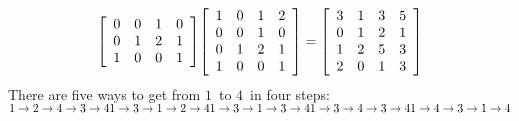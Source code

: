 \documentclass{letter}
\newcommand{\?}{\stackrel{?}{=}}
\newenvironment{Mat}[1]{%
  \left[\begin{array}{*{#1}{r}}
}{%
  \end{array}\right]
}
\begin{document}
\begin{enumerate}
\begin{enumerate}[label=(\alph*)]
{\begin{align*}
\begin{Mat}{4}
                             0 & 0 & 1 & 0 \\
                             0 & 1 & 2 & 1 \\
                             1 & 0 & 0 & 1 
                             \end{Mat}
              \begin{Mat}{4} 1 & 0 & 1 & 2 \\
                             0 & 0 & 1 & 0 \\
                             0 & 1 & 2 & 1 \\
                             1 & 0 & 0 & 1 
                             \end{Mat}
             =\begin{Mat}{4} 3 & 1 & 3 & 5 \\
                             0 & 1 & 2 & 1 \\
                             1 & 2 & 5 & 3 \\
                             2 & 0 & 1 & 3
                             \end{Mat}
      \end{align*}
      There are five ways to get from $1$\ to $4$\ in four steps:\\
      $ 1 \to 2 \to 4 \to 3 \to 4 \\
        1 \to 3 \to 1 \to 2 \to 4 \\
        1 \to 3 \to 1 \to 3 \to 4 \\
        1 \to 3 \to 4 \to 3 \to 4 \\
        1 \to 4 \to 3 \to 1 \to 4$
      
}
\end{enumerate}
\end{enumerate}
\end{document}

